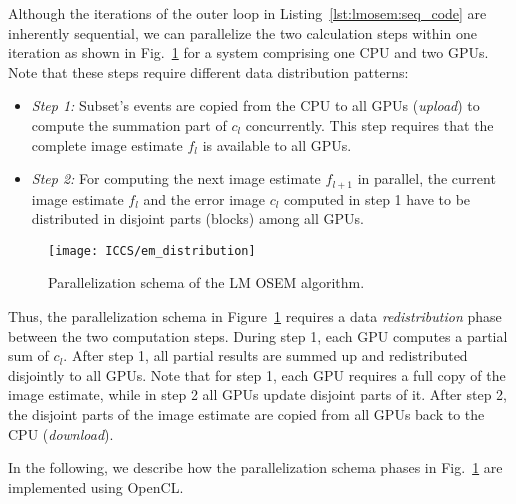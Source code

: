 Although the iterations of the outer loop in Listing~\ref{lst:lmosem:seq_code} are inherently sequential, we can parallelize the two calculation steps within one iteration as shown in Fig.~\ref{fig:lmosem:em_distribution} for a system comprising one CPU and two GPUs.
Note that these steps require different data distribution patterns:
\begin{itemize}
  \item[] \emph{Step 1:} Subset's events are copied from the CPU to all GPUs (\emph{upload}) to compute the summation part of $c_l$ concurrently. This step requires that the complete image estimate $f_l$ is available to all GPUs.
  \item[] \emph{Step 2:} For computing the next image estimate $f_{l+1}$ in parallel, the current image estimate $f_l$ and the error image $c_l$ computed in step 1 have to be distributed in disjoint parts (blocks) among all GPUs.
\end{itemize}

\begin{figure}
  \centering
  \texttt{[image: ICCS/em\_distribution]}
  \caption{Parallelization schema of the LM OSEM algorithm.}
  \label{fig:lmosem:em_distribution}
\end{figure}
Thus, the parallelization schema in Figure~\ref{fig:lmosem:em_distribution} requires a data \emph{redistribution} phase between the two computation steps.
During step 1, each GPU computes a partial sum of $c_l$.
After step 1, all partial results are summed up and redistributed disjointly to all GPUs.
Note that for step 1, each GPU requires a full copy of the image estimate, while in step 2 all GPUs update disjoint parts of it.
After step 2, the disjoint parts of the image estimate are copied from all GPUs back to the CPU (\emph{download}).

\bigskip\noindent
In the following, we describe how the parallelization schema phases in Fig.~\ref{fig:lmosem:em_distribution} are implemented using OpenCL.

